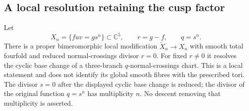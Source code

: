\subsection{A local resolution retaining the cusp factor}

\begin{proposition}\label{push:src:B.4.22}
\label{push:B422}
Let
\[
 X_n=\{fuv=g s^n\}\subset\mathbb C^5,
 \qquad r=g-f,\qquad q=s^n.
\]
There is a proper bimeromorphic local modification
$\widetilde X_n\to X_n$ with smooth total fourfold
and reduced normal-crossings divisor $r=0$.
For fixed $r\ne0$ it resolves the cyclic base change
of a three-branch $q$-normal-crossings chart.
This is a local statement and does not identify its
global smooth fibres with the prescribed tori.
The divisor $s=0$ after the displayed cyclic base change
is reduced; the divisor of the original function $q=s^n$
has multiplicity $n$. No descent removing that multiplicity
is asserted.
\end{proposition}

